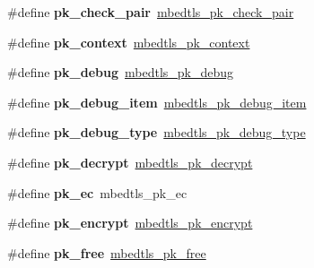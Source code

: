 \begin{DoxyCompactItemize}
\#define {\bfseries pk\+\_\+check\+\_\+pair}~\mbox{\hyperlink{pk_8h_a87f9989d6859e2dceb5e1d4c4491fdca}{mbedtls\+\_\+pk\+\_\+check\+\_\+pair}}
\item 
\mbox{\label{compat-1_83_8h_a7685372900e0ed97e1d397f5448d76d2}} 
\#define {\bfseries pk\+\_\+context}~\mbox{\hyperlink{structmbedtls__pk__context}{mbedtls\+\_\+pk\+\_\+context}}
\item 
\mbox{\label{compat-1_83_8h_a43e71399803f51bda2fffd646c6c2bca}} 
\#define {\bfseries pk\+\_\+debug}~\mbox{\hyperlink{pk_8h_a0fb685e5a303eb149db2a61296986e14}{mbedtls\+\_\+pk\+\_\+debug}}
\item 
\mbox{\label{compat-1_83_8h_aceb3d94e6271f5410cad3bd44cd751c3}} 
\#define {\bfseries pk\+\_\+debug\+\_\+item}~\mbox{\hyperlink{structmbedtls__pk__debug__item}{mbedtls\+\_\+pk\+\_\+debug\+\_\+item}}
\item 
\mbox{\label{compat-1_83_8h_aabd81e8fa72e3bc6ad88c7fd2d5daec3}} 
\#define {\bfseries pk\+\_\+debug\+\_\+type}~\mbox{\hyperlink{pk_8h_a959c5419b3dd34df5420ee83bbc54002}{mbedtls\+\_\+pk\+\_\+debug\+\_\+type}}
\item 
\mbox{\label{compat-1_83_8h_ae56d4d07f1bbf60f41ab86d2c55a5b44}} 
\#define {\bfseries pk\+\_\+decrypt}~\mbox{\hyperlink{pk_8h_a428e2ffa53bb9bb6cf000452881682c1}{mbedtls\+\_\+pk\+\_\+decrypt}}
\item 
\mbox{\label{compat-1_83_8h_a1dd04482c2172694d031370093f32cb1}} 
\#define {\bfseries pk\+\_\+ec}~mbedtls\+\_\+pk\+\_\+ec
\item 
\mbox{\label{compat-1_83_8h_a19713ec4b6598c243bc665c5234623c1}} 
\#define {\bfseries pk\+\_\+encrypt}~\mbox{\hyperlink{pk_8h_ae543fd58f365e84cdfe3689ee2f10113}{mbedtls\+\_\+pk\+\_\+encrypt}}
\item 
\mbox{\label{compat-1_83_8h_a6ca9f90e0b218fa958563f567de2082b}} 
\#define {\bfseries pk\+\_\+free}~\mbox{\hyperlink{pk_8h_ac6a9786d96abfd73c4dff6814238feb9}{mbedtls\+\_\+pk\+\_\+free}}
\item 
\mbox{\label{compat-1_83_8h_ac66df577f04b58338038ef44cc7be992}} 

\end{DoxyCompactItemize}
